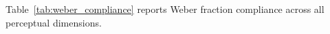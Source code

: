 \documentclass[sigchi, nonacm]{acmart}
\begin{document}


Table~\ref{tab:weber_compliance} reports Weber fraction compliance across all perceptual dimensions.
\end{document}
